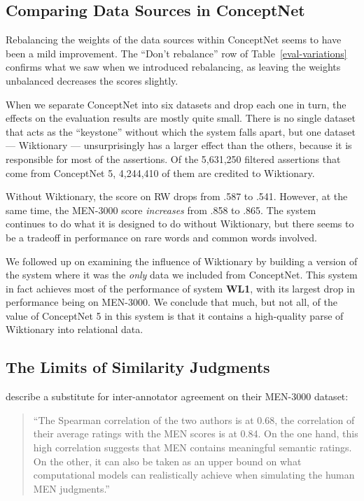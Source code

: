 \documentclass[letterpaper]{article}
\begin{document}
\subsection{Comparing Data Sources in ConceptNet}

Rebalancing the weights of the data sources within ConceptNet seems to have
been a mild improvement. The ``Don't rebalance'' row of Table~\ref{eval-variations}
confirms what we saw when we introduced rebalancing,
as leaving the weights unbalanced decreases the scores slightly.

When we separate ConceptNet into six datasets and drop each one in turn, the
effects on the evaluation results are mostly quite small. There is no single
dataset that acts as the ``keystone'' without which the system falls apart,
but one dataset --- Wiktionary --- unsurprisingly has a larger effect than the
others, because it is responsible for most of the assertions. Of the 5,631,250
filtered assertions that come from ConceptNet 5, 4,244,410 of them are credited
to Wiktionary.

Without Wiktionary, the score on RW drops from .587 to .541. However, at the
same time, the MEN-3000 score {\em increases} from .858 to .865. The system
continues to do what it is designed to do without Wiktionary, but there seems to
be a tradeoff in performance on rare words and common words involved.

We followed up on examining the influence of Wiktionary by building a version of
the system where it was the {\em only} data we included from ConceptNet. This
system in fact achieves most of the performance of system {\bf WL1}, with its
largest drop in performance being on MEN-3000. We conclude that much, but not
all, of the value of ConceptNet 5 in this system is that it contains a
high-quality parse of Wiktionary into relational data.

\subsection{The Limits of Similarity Judgments}

 describe a substitute for inter-annotator agreement on
their MEN-3000 dataset:

\begin{quote}
``The Spearman correlation of the two authors is at 0.68, the correlation of their
average ratings with the MEN scores is at 0.84. On the one hand, this high
correlation suggests that MEN contains meaningful semantic ratings. On the
other, it can also be taken as an upper bound on what computational models can
realistically achieve when simulating the human MEN judgments.''
\end{quote}
\end{document}
